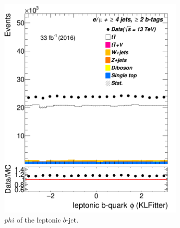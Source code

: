 \begin{figure} %
	\centering
	\begin{subfigure}{0.35\textwidth}
		\includegraphics[width=\linewidth]{ControlPlots_emujets_2016_4incl_2incl/klf_blep_phi_emujets_2016.png}
		\caption{$phi$ of the leptonic $b$-jet.} \label{fig:klf61}
	\end{subfigure}
	\hspace*{1.5cm}
	\begin{subfigure}{0.35\textwidth}

\end{subfigure}
\end{figure}

